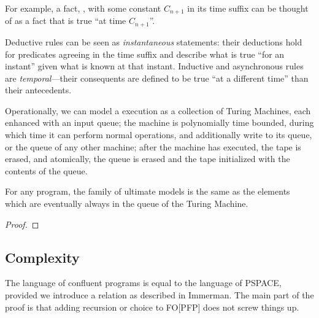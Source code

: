For example, a fact, , with some constant $C_{n+1}$ in its time
suffix can be thought of as a fact that is true ``at time $C_{n+1}$''.

Deductive rules can be seen as {\em instantaneous} statements: their deductions hold for 
predicates agreeing in the time suffix and describe what is true ``for an instant'' given 
what is known at that instant.
 Inductive and asynchronous 
 rules are {\em temporal}---their consequents are defined to
be true ``at a different time'' than their antecedents.

Operationally, we can model a \lang execution as a collection of Turing Machines, each enhanced with an input queue; the machine is polynomially time bounded, during which time it can perform normal operations, and additionally write to its queue, or the queue of any other machine; after the machine has executed, the tape is erased, and atomically, the queue is erased and the tape initialized with the contents of the queue. 

\begin{lemma}
For any \lang program, the family of ultimate models is the same as the elements which are eventually always in the queue of the Turing Machine. 
\end{lemma}
\begin{proof}
\end{proof}


\subsection{Complexity}

The language of confluent \lang programs is equal to the language of PSPACE, provided we introduce a  relation as described in Immerman.  The main part of the proof is that adding recursion or choice to FO[PFP] does not screw things up.  
